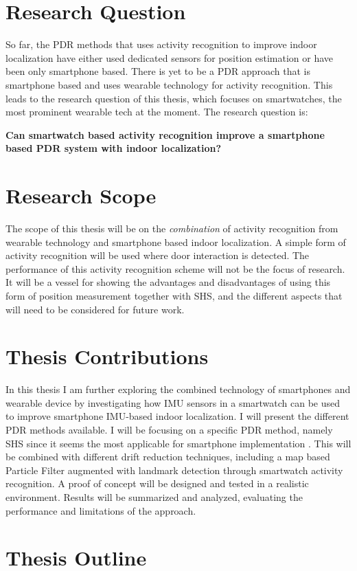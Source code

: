 \section{Research Question}

So far, the PDR methods that uses activity recognition to improve indoor localization have either used dedicated sensors for position estimation or have been only smartphone based. There is yet to be a \ac{PDR} approach that is smartphone based and uses wearable technology for activity recognition. This leads to the research question of this thesis, which focuses on smartwatches, the most prominent wearable tech at the moment. The research question is:

\textbf{Can smartwatch based activity recognition improve a smartphone based \ac{PDR} system with indoor localization?}

\section{Research Scope}

The scope of this thesis will be on the \textit{combination} of activity recognition from wearable technology and smartphone based indoor localization. A simple form of activity recognition will be used where door interaction is detected. The performance of this activity recognition scheme will not be the focus of research. It will be a vessel for showing the advantages and disadvantages of using this form of position measurement together with \ac{SHS}, and the different aspects that will need to be considered for future work.

\section{Thesis Contributions}

In this thesis I am further exploring the combined technology of smartphones and wearable device by investigating how \ac{IMU} sensors in a smartwatch can be used to improve smartphone IMU-based indoor localization. I will present the different \ac{PDR} methods available. I will be focusing on a specific \ac{PDR} method, namely \ac{SHS} since it seems the most applicable for smartphone implementation \cite{Kang2015}. This will be combined with different drift reduction techniques, including a map based Particle Filter augmented with landmark detection through smartwatch activity recognition. A proof of concept will be designed and tested in a realistic environment. Results will be summarized and analyzed, evaluating the performance and limitations of the approach.

\section{Thesis Outline}
